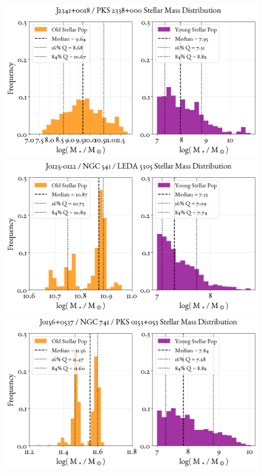 \begin{figure}
    \centering
    \includegraphics[width=0.8\linewidth]{figures/ResultMasses/86_MassDistri_5170.png}\\
    \includegraphics[width=0.8\linewidth]{figures/ResultMasses/93_MassDistri_5260.png}\\
    \includegraphics[width=0.8\linewidth]{figures/ResultMasses/94_MassDistri_5261.png}    
\end{figure}

